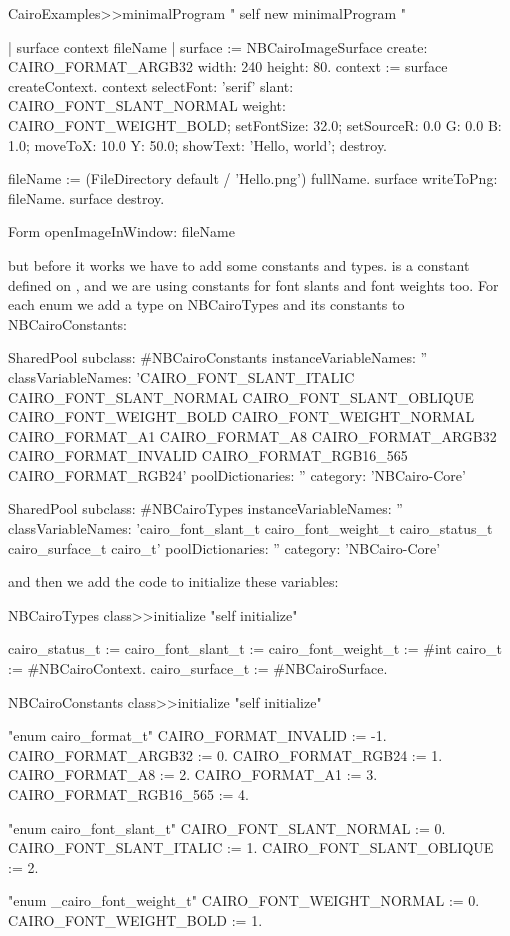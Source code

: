 \documentclass[a4paper,10pt,twoside]{book}
\begin{document}
\begin{code}{}
CairoExamples>>minimalProgram
  "
  self new minimalProgram
  "
  
  | surface context fileName |
  surface := NBCairoImageSurface create: CAIRO_FORMAT_ARGB32 width: 240 height: 80.
  context := surface createContext.
  context selectFont: 'serif' slant: CAIRO_FONT_SLANT_NORMAL weight: CAIRO_FONT_WEIGHT_BOLD;
      setFontSize: 32.0;
      setSourceR: 0.0 G: 0.0 B: 1.0;
      moveToX: 10.0 Y: 50.0;
      showText: 'Hello, world';
      destroy.

  fileName := (FileDirectory default / 'Hello.png') fullName.
  surface writeToPng: fileName.
  surface destroy.

  Form openImageInWindow: fileName
\end{code}


but before it works we have to add some constants and types.
 is a constant defined on
, and we are using constants for
font slants and font weights too. For each enum we add
a type on NBCairoTypes and its constants to NBCairoConstants:

\begin{code}{}
SharedPool subclass: #NBCairoConstants
	instanceVariableNames: ''
	classVariableNames: 'CAIRO_FONT_SLANT_ITALIC CAIRO_FONT_SLANT_NORMAL CAIRO_FONT_SLANT_OBLIQUE CAIRO_FONT_WEIGHT_BOLD CAIRO_FONT_WEIGHT_NORMAL CAIRO_FORMAT_A1 CAIRO_FORMAT_A8 CAIRO_FORMAT_ARGB32 CAIRO_FORMAT_INVALID CAIRO_FORMAT_RGB16_565 CAIRO_FORMAT_RGB24'
	poolDictionaries: ''
	category: 'NBCairo-Core'

SharedPool subclass: #NBCairoTypes
	instanceVariableNames: ''
	classVariableNames: 'cairo_font_slant_t cairo_font_weight_t cairo_status_t cairo_surface_t cairo_t'
	poolDictionaries: ''
	category: 'NBCairo-Core'
\end{code}

and then we add the code to initialize these variables:

\begin{code}{}
NBCairoTypes class>>initialize
  "self initialize"

  cairo_status_t := cairo_font_slant_t := cairo_font_weight_t := #int
  cairo_t := #NBCairoContext.
  cairo_surface_t  := #NBCairoSurface.


NBCairoConstants class>>initialize
  "self initialize"

  "enum cairo_format_t"
  CAIRO_FORMAT_INVALID :=  -1.
  CAIRO_FORMAT_ARGB32 :=  0.
  CAIRO_FORMAT_RGB24 := 1.
  CAIRO_FORMAT_A8 := 2.
  CAIRO_FORMAT_A1 := 3.
  CAIRO_FORMAT_RGB16_565 := 4.

  "enum cairo_font_slant_t"
  CAIRO_FONT_SLANT_NORMAL := 0.
  CAIRO_FONT_SLANT_ITALIC := 1.
  CAIRO_FONT_SLANT_OBLIQUE := 2.

  "enum _cairo_font_weight_t"
  CAIRO_FONT_WEIGHT_NORMAL := 0.
  CAIRO_FONT_WEIGHT_BOLD := 1.
\end{code}
\end{document}
